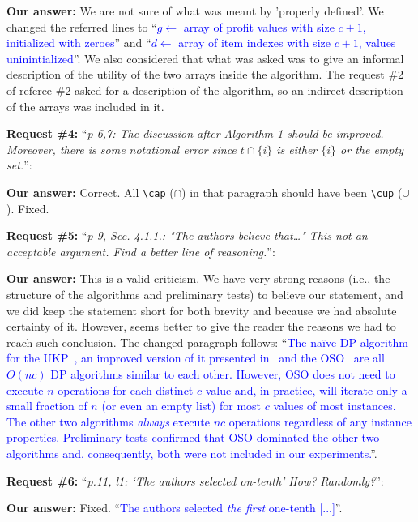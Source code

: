 \documentclass{elsarticle}
\begin{document}
\textbf{Our answer:} We are not sure of what was meant by 'properly defined'. We changed the referred lines to ``\textcolor{blue}{\(g \leftarrow\) array of profit values with size \(c + 1\), initialized with zeroes}'' and ``\textcolor{blue}{\(d \leftarrow\) array of item indexes with size \(c + 1\), values uninintialized}''. We also considered that what was asked was to give an informal description of the utility of the two arrays inside the algorithm. The request \#2 of referee \#2 asked for a description of the algorithm, so an indirect description of the arrays was included in it.
\medskip

\textbf{Request \#4:} ``\textit{p 6,7: The discussion after Algorithm 1 should be improved. Moreover, there is some notational error since \(t \cap \{i\}\)  is either \(\{i\}\) or the empty set.}'': 

\textbf{Our answer:} Correct. All \verb+\cap+ (\(\cap\)) in that paragraph should have been \verb+\cup+ (\(\cup\)). Fixed.
\medskip

\textbf{Request \#5:} ``\textit{p 9, Sec. 4.1.1.: "The authors believe that…" This not an acceptable argument. Find a better line of reasoning.}'': 

\textbf{Our answer:} This is a valid criticism. We have very strong reasons (i.e., the structure of the algorithms and preliminary tests) to believe our statement, and we did keep the statement short for both brevity and because we had absolute certainty of it. However, seems better to give the reader the reasons we had to reach such conclusion. The changed paragraph follows: ``\textcolor{blue}{The naïve DP algorithm for the UKP~\cite[p.~311]{tchu}, an improved version of it presented in~\cite[p.~221]{garfinkel} and the OSO~\cite[p.~15]{gg-66} are all \(O(nc)\) DP algorithms similar to each other. %
However, OSO does not need to execute \(n\) operations for each distinct \(c\) value and, in practice, will iterate only a small fraction of \(n\) (or even an empty list) for most \(c\) values of most instances.
The other two algorithms \emph{always} execute \(nc\) operations regardless of any instance properties.
Preliminary tests confirmed that OSO dominated the other two algorithms and, consequently, both were not included in our experiments.}''.
\medskip

\textbf{Request \#6:} ``\textit{p.11, l1: `The authors selected on-tenth' How? Randomly?}'':

\textbf{Our answer: } Fixed. ``\textcolor{blue}{The authors selected \emph{the first} one-tenth [...]}''.
\medskip
\end{document}
